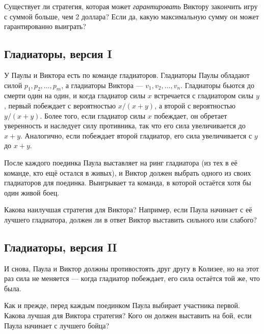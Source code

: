 \medskip

Существует ли стратегия, которая может \emph{гарантировать} Виктору закончить игру с суммой больше, чем 2 доллара?
Если да, какую максимальную сумму он может гарантированно выиграть? 

\subsection*{Гладиаторы, версия I} %

У Паулы и Виктора есть по команде гладиаторов.
Гладиаторы Паулы обладают силой $p_1, p_2,\dots, p_m$, а гладиаторы Виктора --- $v_1, v_2,\dots, v_n$.
Гладиаторы бьются до смерти один на один, и когда гладиатор силы $x$ встречается с гладиатором силы $y$, первый побеждает с вероятностью $x/(x+y)$, а второй с вероятностью $y/(x+y)$.
Более того, если гладиатор силы $x$ побеждает, он обретает уверенность и наследует силу противника, так что его сила увеличивается до $x+y$.
Аналогично, если побеждает второй гладиатор, его сила увеличивается с $y$ до $x+y$.

После каждого поединка Паула выставляет на ринг гладиатора (из тех в её команде, кто ещё остался в живых), и Виктор должен выбрать одного из своих гладиаторов для поединка.
Выигрывает та команда, в которой остаётся хотя бы один живой боец.

\medskip

Какова наилучшая стратегия для Виктора?
Например, если Паула начинает с её лучшего гладиатора, должен ли в ответ Виктор выставить сильного или слабого?

\subsection*{Гладиаторы, версия II} %

И снова, Паула и Виктор должны противостоять друг другу в Колизее, но на этот раз сила не меняется --- когда гладиатор побеждает, его сила остаётся той же, что была. %

\medskip

Как и прежде, перед каждым поединком Паула выбирает участника первой.
Какова лучшая для Виктора стратегия? Кого он должен выставить на бой, если Паула начинает с лучшего бойца?
